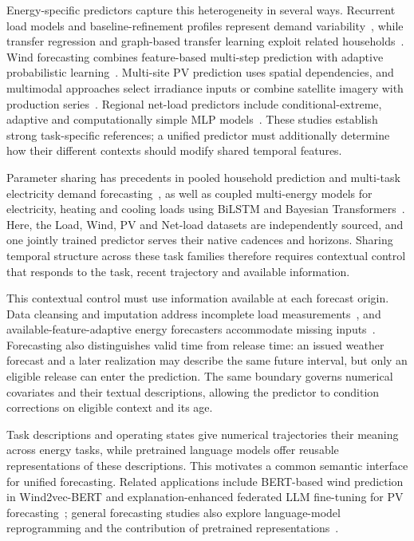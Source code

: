 \documentclass[journal]{IEEEtran}
\begin{document}
Energy-specific predictors capture this heterogeneity in several ways. Recurrent load models and baseline-refinement profiles represent demand variability~\cite{kong2019residentiallstm,xiao2024baselinerefine}, while transfer regression and graph-based transfer learning exploit related households~\cite{wu2020transferload,wu2023gnntransfer}. Wind forecasting combines feature-based multi-step prediction with adaptive probabilistic learning~\cite{decaro2022dafte,meng2024metawind}. Multi-site PV prediction uses spatial dependencies, and multimodal approaches select irradiance inputs or combine satellite imagery with production series~\cite{simeunovic2022graphpv,jing2025solarfusionnet,wang2025robustmultimodalpv}. Regional net-load predictors include conditional-extreme, adaptive and computationally simple MLP models~\cite{browell2021regionalNetLoad,devilmarest2024adaptive,faustine2025efficiency}. These studies establish strong task-specific references; a unified predictor must additionally determine how their different contexts should modify shared temporal features.

Parameter sharing has precedents in pooled household prediction and multi-task electricity demand forecasting~\cite{shi2018poolingrnn,fiot2018multitask}, as well as coupled multi-energy models for electricity, heating and cooling loads using BiLSTM and Bayesian Transformers~\cite{guo2022bilstmmultienergy,wang2024bayesianmultienergy}. Here, the Load, Wind, PV and Net-load datasets are independently sourced, and one jointly trained predictor serves their native cadences and horizons. Sharing temporal structure across these task families therefore requires contextual control that responds to the task, recent trajectory and available information.

This contextual control must use information available at each forecast origin. Data cleansing and imputation address incomplete load measurements~\cite{mateos2013lowrank}, and available-feature-adaptive energy forecasters accommodate missing inputs~\cite{stratigakos2026missingadaptive}. Forecasting also distinguishes valid time from release time: an issued weather forecast and a later realization may describe the same future interval, but only an eligible release can enter the prediction. The same boundary governs numerical covariates and their textual descriptions, allowing the predictor to condition corrections on eligible context and its age.

Task descriptions and operating states give numerical trajectories their meaning across energy tasks, while pretrained language models offer reusable representations of these descriptions. This motivates a common semantic interface for unified forecasting. Related applications include BERT-based wind prediction in Wind2vec-BERT and explanation-enhanced federated LLM fine-tuning for PV forecasting~\cite{yu2025windbert,song2026llmpv}; general forecasting studies also explore language-model reprogramming and the contribution of pretrained representations~\cite{jin2024timellm,tan2024llmts_critique}.
\end{document}
